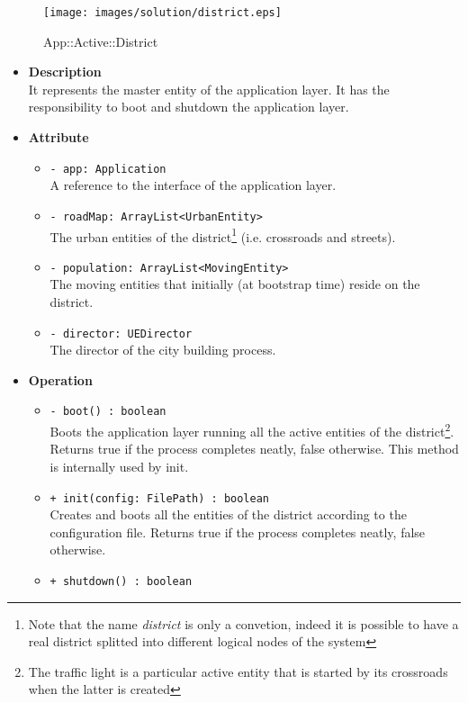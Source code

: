 \begin{figure}[h]
\centering
\texttt{[image: images/solution/district.eps]}
\caption{App::Active::District}
\label{fig:sd-app-district}
\end{figure}
\FloatBarrier
\begin{itemize}
  \item \textbf{Description} \\
It represents the master entity of the application layer. 
It has the responsibility to boot and shutdown the application layer.
  \item \textbf{Attribute}
  \begin{itemize}
    \item \texttt{- app: Application} \\
A reference to the interface of the application layer.
    \item \texttt{- roadMap: ArrayList<UrbanEntity>} \\
The urban entities of the district\footnote{Note that the name 
\textit{district} is only a convetion, indeed it is possible to have a 
real district splitted into different logical nodes of the system}
(i.e. crossroads and streets). 
    \item \texttt{- population: ArrayList<MovingEntity>} \\
The moving entities that initially (at bootstrap time) reside on the district.
    \item \texttt{- director: UEDirector} \\ 
The director of the city building process.
  \end{itemize}
  \item \textbf{Operation}
  \begin{itemize} 
    \item \texttt{- boot() : boolean} \\
Boots the application layer running all the active entities of the 
district\footnote{The traffic light is a particular active entity that 
is started by its crossroads when the latter is created}. 
Returns true if the process completes neatly, false otherwise. 
This method is internally used by init.
    \item \texttt{+ init(config: FilePath) : boolean} \\
Creates and boots all the entities of the district according to the 
configuration file. Returns true if the process completes neatly, false 
otherwise.
    \item \texttt{+ shutdown() : boolean} \\

\end{itemize}
\end{itemize}
